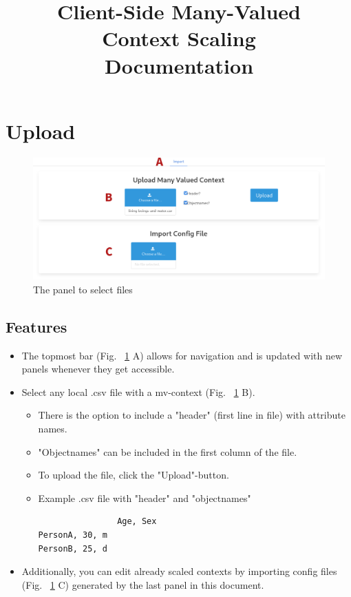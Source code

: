 \documentclass[]{article}
\title{Client-Side Many-Valued \protect\\ Context Scaling \protect\\ Documentation}
\begin{document}
\maketitle

\newpage
\section{Upload}
\begin{figure}[H]
	\includegraphics[width=\linewidth]{images/upload.png}
	\caption{The panel to select files}
	\label{fig:p1}
\end{figure}
\subsection{Features}
\begin{itemize}
    \item The topmost bar (Fig. ~\ref{fig:p1} A) allows for navigation and is updated with new panels whenever they get accessible.
	\item Select any local .csv file with a mv-context (Fig. ~\ref{fig:p1} B).
    \begin{itemize}
        \item There is the option to include a "header" (first line in file) with attribute names.
        \item "Objectnames" can be included in the first column of the file.
        \item To upload the file, click the "Upload"-button.
		\item Example .csv file with "header" and "objectnames"
		\begin{lstlisting}
				Age, Sex
PersonA, 30, m
PersonB, 25, d\end{lstlisting}
    \end{itemize}
    \item Additionally, you can edit already scaled contexts by importing config files (Fig. ~\ref{fig:p1} C) generated by the last panel in this document.
\end{itemize}
\end{document}
